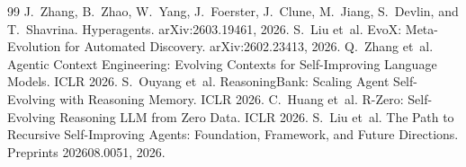 \documentclass[11pt,a4paper]{article}
\begin{document}
\begin{thebibliography}{99}
 J.~Zhang, B.~Zhao, W.~Yang, J.~Foerster, J.~Clune, M.~Jiang, S.~Devlin, and T.~Shavrina. Hyperagents. arXiv:2603.19461, 2026.
 S.~Liu et~al. EvoX: Meta-Evolution for Automated Discovery. arXiv:2602.23413, 2026.
 Q.~Zhang et~al. Agentic Context Engineering: Evolving Contexts for Self-Improving Language Models. ICLR 2026.
 S.~Ouyang et~al. ReasoningBank: Scaling Agent Self-Evolving with Reasoning Memory. ICLR 2026.
 C.~Huang et~al. R-Zero: Self-Evolving Reasoning LLM from Zero Data. ICLR 2026.
 S.~Liu et~al. The Path to Recursive Self-Improving Agents: Foundation, Framework, and Future Directions. Preprints 202608.0051, 2026.
\end{thebibliography}
\end{document}
